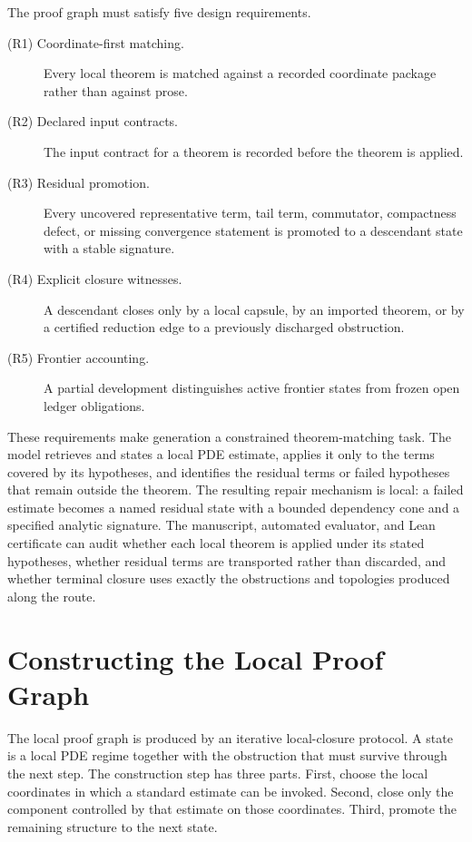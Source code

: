 \documentclass[11pt]{article}
\theoremstyle{plain}
\theoremstyle{definition}
\theoremstyle{remark}
\begin{document}
The proof graph must satisfy five design requirements.
\begin{description}
  \item[\textup{(R1) Coordinate-first matching.}]
  Every local theorem is matched against a recorded coordinate package rather
  than against prose.
  \item[\textup{(R2) Declared input contracts.}]
  The input contract for a theorem is recorded before the theorem is applied.
  \item[\textup{(R3) Residual promotion.}]
  Every uncovered representative term, tail term, commutator, compactness
  defect, or missing convergence statement is promoted to a descendant state
  with a stable signature.
  \item[\textup{(R4) Explicit closure witnesses.}]
  A descendant closes only by a local capsule, by an imported theorem, or by a
  certified reduction edge to a previously discharged obstruction.
  \item[\textup{(R5) Frontier accounting.}]
  A partial development distinguishes active frontier states from frozen open
  ledger obligations.
\end{description}

These requirements make generation a constrained theorem-matching task.  The
model retrieves and states a local PDE estimate, applies it only to the terms
covered by its hypotheses, and identifies the residual terms or failed
hypotheses that remain outside the theorem.  The resulting repair mechanism is
local: a failed estimate becomes a named residual state with a bounded
dependency cone and a specified analytic signature.  The manuscript, automated
evaluator, and Lean certificate can audit whether each local theorem is applied
under its stated hypotheses, whether residual terms are transported rather than
discarded, and whether terminal closure uses exactly the obstructions and
topologies produced along the route.

\section{Constructing the Local Proof Graph}
\label{sec:constructing-local-proof-graph}

The local proof graph is produced by an iterative local-closure protocol.  A state
is a local PDE regime together with the obstruction that must survive through
the next step.  The construction step has three parts.  First, choose the local
coordinates in which a standard estimate can be invoked.  Second, close only
the component controlled by that estimate on those coordinates.  Third, promote
the remaining structure to the next state.
\end{document}
